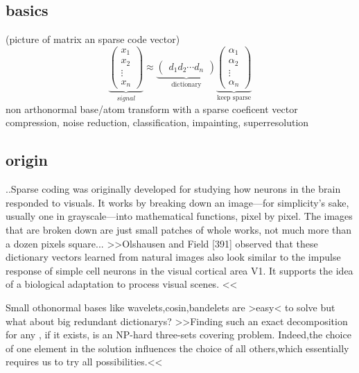 \subsection{basics}
\begin{frame}
(picture of matrix an sparse code vector)
\[
\underbrace{\begin{pmatrix} x_1 \\ x_2 \\ \vdots \\ x_n \end{pmatrix}}_{signal} \approx \underbrace{\begin{pmatrix} d_1  d_2 \cdots d_n \end{pmatrix}}_{\textrm{dictionary}}
\underbrace{\begin{pmatrix} \alpha_1 \\ \alpha_2 \\ \vdots \\ \alpha_n \end{pmatrix}}_{\textrm{keep sparse}}
\]
non arthonormal base/atom transform with a sparse coeficent vector
compression, noise reduction, classification, impainting,  superresolution

\end{frame}

\subsection{origin}
\begin{frame}
..Sparse coding was originally developed for studying how neurons in the brain responded to visuals. It works by breaking down an image—for simplicity's sake, usually one in grayscale—into mathematical functions, pixel by pixel. The images that are broken down are just small patches of whole works, not much more than a dozen pixels square...
>>Olshausen and Field [391] observed that these
dictionary vectors learned from natural images also look similar to the impulse
response of simple cell neurons in the visual cortical area V1. It supports the idea
of a biological adaptation to process visual scenes. <<
\end{frame}

\begin{frame}
Small othonormal bases like wavelets,cosin,bandelets are >easy< to solve but what about big redundant dictionarys?
>>Finding such an exact decomposition for any , if it exists, is an NP-hard three-sets
covering problem. Indeed,the choice of one element in the solution influences the
choice of all others,which essentially requires us to try all possibilities.<<

\end{frame}

